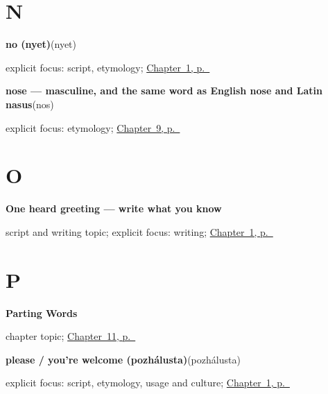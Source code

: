 \section*{N}

\noindent\begin{minipage}[t]{\linewidth}
\raggedright
\textbf{no (nyet)}\enspace\emph{}\enspace(nyet)\par
\footnotesize explicit focus: script, etymology; \hyperref[ch:russian-greetings]{Chapter~1, p.~\pageref*{ch:russian-greetings}}
\end{minipage}\par\smallskip

\noindent\begin{minipage}[t]{\linewidth}
\raggedright
\textbf{nose — masculine, and the same word as English nose and Latin nasus}\enspace\emph{}\enspace(nos)\par
\footnotesize explicit focus: etymology; \hyperref[ch:russian-face-parts]{Chapter~9, p.~\pageref*{ch:russian-face-parts}}
\end{minipage}\par\smallskip

\section*{O}

\noindent\begin{minipage}[t]{\linewidth}
\raggedright
\textbf{One heard greeting — write what you know}\par
\footnotesize script and writing topic; explicit focus: writing; \hyperref[ch:russian-greetings]{Chapter~1, p.~\pageref*{ch:russian-greetings}}
\end{minipage}\par\smallskip

\section*{P}

\noindent\begin{minipage}[t]{\linewidth}
\raggedright
\textbf{Parting Words}\par
\footnotesize chapter topic; \hyperref[ch:russian-parting-words]{Chapter~11, p.~\pageref*{ch:russian-parting-words}}
\end{minipage}\par\smallskip

\noindent\begin{minipage}[t]{\linewidth}
\raggedright
\textbf{please / you're welcome (pozhálusta)}\enspace\emph{}\enspace(pozhálusta)\par
\footnotesize explicit focus: script, etymology, usage and culture; \hyperref[ch:russian-greetings]{Chapter~1, p.~\pageref*{ch:russian-greetings}}
\end{minipage}\par\smallskip

